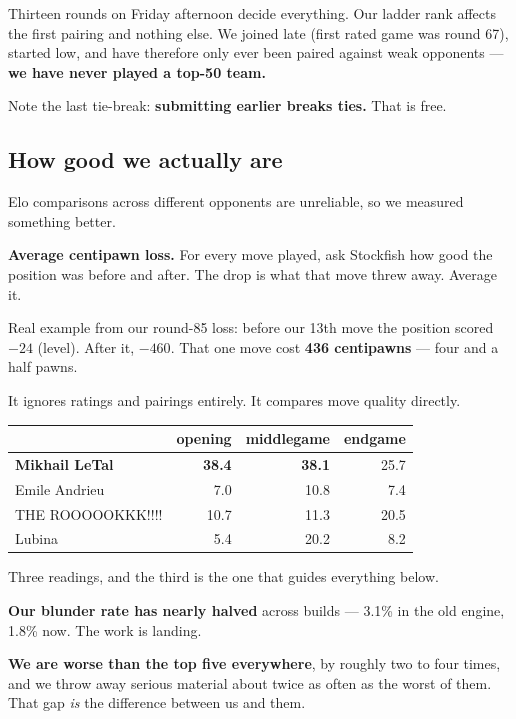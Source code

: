 \documentclass[11pt,a4paper]{article}
\newcommand{\good}[1]{\textcolor{teal!70!black}{\textbf{#1}}}
\newcommand{\bad}[1]{\textcolor{red!65!black}{\textbf{#1}}}
\begin{document}
Thirteen rounds on Friday afternoon decide everything. Our ladder rank affects the first pairing
and nothing else. We joined late (first rated game was round 67), started low, and have therefore
only ever been paired against weak opponents --- \textbf{we have never played a top-50 team.}

Note the last tie-break: \textbf{submitting earlier breaks ties.} That is free.

\subsection{How good we actually are}

Elo comparisons across different opponents are unreliable, so we measured something better.

\begin{keybox}
\textbf{Average centipawn loss.} For every move played, ask Stockfish how good the position was
before and after. The drop is what that move threw away. Average it.

Real example from our round-85 loss: before our 13th move the position scored $-24$ (level).
After it, $-460$. That one move cost \textbf{436 centipawns} --- four and a half pawns.

It ignores ratings and pairings entirely. It compares move quality directly.
\end{keybox}

\begin{center}
\begin{tabular}{lrrr}
\toprule
& opening & middlegame & endgame \\
\midrule
\textbf{Mikhail LeTal} & \bad{38.4} & \bad{38.1} & 25.7 \\
Emile Andrieu & 7.0 & 10.8 & 7.4 \\
THE ROOOOOKKK!!!! & 10.7 & 11.3 & 20.5 \\
Lubina & 5.4 & 20.2 & 8.2 \\
\bottomrule
\end{tabular}
\end{center}

Three readings, and the third is the one that guides everything below.

\good{Our blunder rate has nearly halved} across builds --- 3.1\% in the old engine, 1.8\% now.
The work is landing.

\bad{We are worse than the top five everywhere}, by roughly two to four times, and we throw away
serious material about twice as often as the worst of them. That gap \emph{is} the difference
between us and them.
\end{document}
